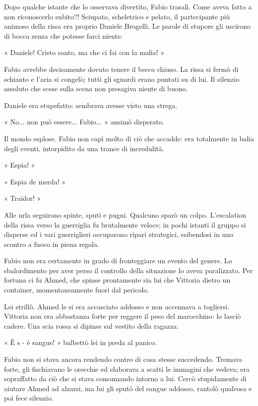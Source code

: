 Dopo qualche istante che lo osservava divertito, Fabio trasalì. Come aveva fatto a non riconoscerlo subito?! Sciupato, scheletrico e pelato, il partecipante più animoso della rissa era proprio Daniele Brogelli. Le parole di stupore gli uscirono di bocca senza che potesse farci niente:

« Daniele! Cristo santo, ma che ci fai con la mafia! »

Fabio avrebbe decisamente dovuto tenere il becco chiuso. La rissa si fermò di schianto e l'aria si congelò; tutti gli sguardi erano puntati su di lui. Il silenzio assoluto che scese sulla scena non presagiva niente di buono.

Daniele era stupefatto: sembrava avesse visto una strega.

« No... non può essere... Fabio... » ansimò disperato.

Il mondo esplose. Fabio non capì molto di ciò che accadde: era totalmente in balia degli eventi, intorpidito da una trance di incredulità.

« Espia! »

« Espia de merda! »

« Traïdor! »

Alle urla seguirono spinte, sputi e pugni. Qualcuno sparò un colpo. L'escalation della rissa verso la guerriglia fu brutalmente veloce; in pochi istanti il gruppo si disperse ed i vari guerriglieri occuparono ripari strategici, esibendosi in uno scontro a fuoco in piena regola.

Fabio non era certamente in grado di fronteggiare un evento del genere. Lo sbalordimento per aver perso il controllo della situazione lo aveva paralizzato. Per fortuna ci fu Ahmed, che spinse prontamente sia lui che Vittoria dietro un container, momentaneamente fuori dal pericolo.

Lei strillò. Ahmed le si era accasciato addosso e non accennava a togliersi. Vittoria non era abbastanza forte per reggere il peso del marocchino: lo lasciò cadere. Una scia rossa si dipinse sul vestito della ragazza.

« È s - è sangue! » balbettò lei in preda al panico.

Fabio non si stava ancora rendendo contro di cosa stesse succedendo. Tremava forte, gli fischiavano le orecchie ed elaborava a scatti le immagini che vedeva; era sopraffatto da ciò che si stava consumando intorno a lui. Cercò stupidamente di aiutare Ahmed ad alzarsi, ma lui gli sputò del sangue addosso, rantolò qualcosa e poi fece silenzio.

